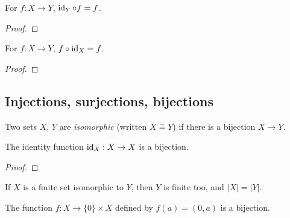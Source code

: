 \begin{proposition}
  \label{prop:prelims:id-comp}
  \leanok
  For $f : X \to Y$, $\operatorname{id}_Y \circ f = f$.
\end{proposition}
\begin{proof}
  \leanok
\end{proof}

\begin{proposition}
  \label{prop:prelims:comp-id}
  \leanok
  For $f : X \to Y$, $f \circ \operatorname{id}_X = f$.
\end{proposition}
\begin{proof}
  \leanok
\end{proof}

\subsection{Injections, surjections, bijections}
\label{subsec:prelims:injections-surjections-bijections}

\begin{definition}[Isomorphic]
  \label{def:prelims:isomorphic}
  \leanok
  Two sets $X$, $Y$ are \emph{isomorphic} (written
  $X \overset{\sim}{=} Y$) if there is a bijection $X \to Y$.
\end{definition}

\begin{proposition}
  \label{prop:prelims:bijective-id}
  \leanok
  The identity function $\operatorname{id}_X : X \to X$ is a bijection.
\end{proposition}
\begin{proof}
  \leanok
\end{proof}

\begin{proposition}
  \label{prop:prelims:finite-card-eq-of-isomorphic}
  If $X$ is a finite set isomorphic to $Y$, then $Y$ is finite too, and
  $|X| = |Y|$.
\end{proposition}

\begin{proposition}
  \label{prop:prelims:bijective-unit-prod-mk}
  The function $f : X \to \{0\} \times X$ defined by $f(a) = (0,a)$ is
  a bijection.
\end{proposition}

